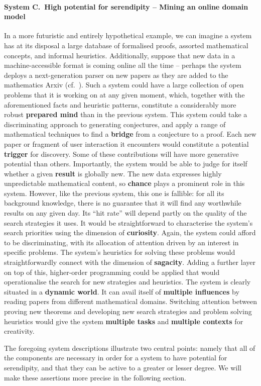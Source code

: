 \paragraph{System C.~High potential for serendipity -- Mining an online domain model} 
In a more futuristic and entirely hypothetical example, we can imagine a system has at its
disposal a large database of formalised proofs, assorted mathematical
concepts, and informal heuristics.   
Additionally, suppose that new data in a machine-accessible format is coming online
all the time -- perhaps the system deploys a next-generation parser on
new papers as they are added to the mathematics Arxiv
(cf.~\citet{ginev2009architecture}).  Such a system could have
a large collection of open problems that it is working on at any given
moment, which, together with the aforementioned facts and heuristic patterns,
constitute a considerably more robust \textbf{prepared mind} than in
the previous system.  This system could take a discriminating
approach to generating conjectures, and apply a range of mathematical
techniques to find a \textbf{bridge} from a conjecture to a proof.
Each new paper or fragment of user interaction it encounters would constitute
a potential \textbf{trigger} for discovery.  Some of these contributions will have
more generative potential than others.  Importantly, the system would
be able to judge for itself whether a given \textbf{result} is globally
new.  The new data expresses highly unpredictable mathematical
content, so \textbf{chance} plays a prominent role in this 
system.  However, like the previous system, this one is fallible: for
all its background knowledge, there is no guarantee that it will find
any worthwhile results on any given day.  Its ``hit rate'' will depend partly on the quality of
the search strategies it uses.  It would be straightforward to
characterise the system's search priorities using the dimension of
\textbf{curiosity}.  Again, the system could afford to be
discriminating, with its allocation of attention driven by an interest in
specific problems.
The system's heuristics for solving these problems would
straightforwardly connect with the dimension of \textbf{sagacity}.
Adding a further layer on top of this, higher-order programming could
be applied that would operationalise the search for new strategies
and heuristics.  The system is clearly situated in a \textbf{dynamic
  world}.  It can avail itself of \textbf{multiple influences} by
reading papers from different mathematical domains.  Switching
attention between proving new theorems and developing new search
strategies and problem solving heuristics would give the system
\textbf{multiple tasks} and \textbf{multiple contexts} for creativity.

\bigskip

The foregoing system descriptions illustrate two central points:
namely that all of the components are necessary in order for a system
to have potential for serendipity, and that they can be active to a
greater or lesser degree.  We will make these assertions more precise
in the following section.

